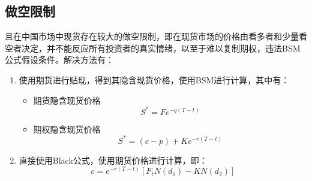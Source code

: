 \documentclass[11pt]{article}
\begin{document}
\subsection{做空限制}
且在中国市场中现货存在较大的做空限制，即在现货市场的价格由看多者和少量看空者决定，并不能反应所有投资者的真实情绪，以至于难以复制期权，违法BSM公式假设条件。解决方法有：


\begin{enumerate}
    \item 使用期货进行贴现，得到其隐含现货价格，使用BSM进行计算，其中有：
          \begin{itemize}
              \item 期货隐含现货价格
                    \begin{equation*}
                        S^* = F e^{-q(T-t)}
                    \end{equation*}
              \item 期权隐含现货价格
                    \begin{equation*}
                        S^* = (c-p) + Ke^{-r(T-t)}
                    \end{equation*}
          \end{itemize}
    \item 直接使用Black公式，使用期货价格进行计算，即：
          \begin{equation*}
              c = e^{-r(T-t)} \left[ F_t N(d_1)-K N(d_2) \right]
          \end{equation*}
\end{enumerate}
\end{document}
